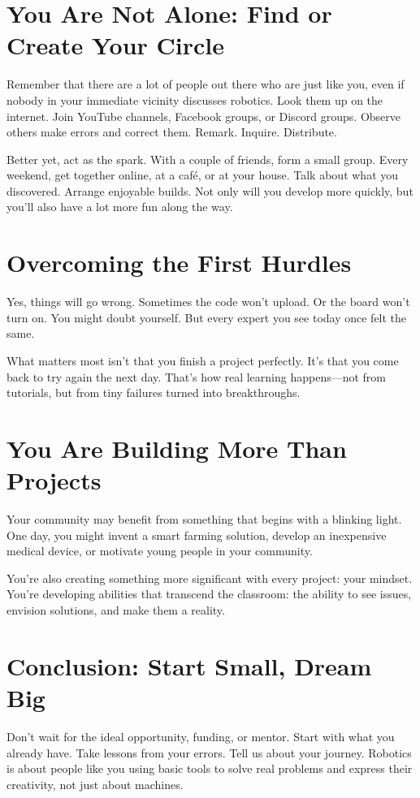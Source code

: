 \documentclass[a4paper,10pt,twocolumn]{memoir}
\begin{document}
{{{{{{\section*{You Are Not Alone: Find or Create Your Circle}
Remember that there are a lot of people out there who are just like you, even if nobody in your immediate vicinity discusses robotics. Look them up on the internet. Join YouTube channels, Facebook groups, or Discord groups. Observe others make errors and correct them. Remark. Inquire. Distribute.

Better yet, act as the spark. With a couple of friends, form a small group. Every weekend, get together online, at a café, or at your house. Talk about what you discovered. Arrange enjoyable builds. Not only will you develop more quickly, but you’ll also have a lot more fun along the way.
\section*{Overcoming the First Hurdles}
Yes, things will go wrong. Sometimes the code won’t upload. Or the board won’t turn on. You might doubt yourself. But every expert you see today once felt the same.

What matters most isn’t that you finish a project perfectly. It’s that you come back to try again the next day. That’s how real learning happens—not from tutorials, but from tiny failures turned into breakthroughs.
\section*{You Are Building More Than Projects}
Your community may benefit from something that begins with a blinking light. One day, you might invent a smart farming solution, develop an inexpensive medical device, or motivate young people in your community.

You’re also creating something more significant with every project: your mindset. You’re developing abilities that transcend the classroom: the ability to see issues, envision solutions, and make them a reality.
\section*{Conclusion: Start Small, Dream Big}
Don’t wait for the ideal opportunity, funding, or mentor. Start with what you already have. Take lessons from your errors. Tell us about your journey. Robotics is about people like you using basic tools to solve real problems and express their creativity, not just about machines.

}}}}}}
\end{document}
